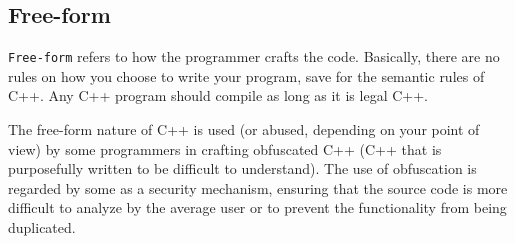 \subsection{Free-form}
\texttt{Free-form} refers to how the programmer crafts the code. Basically,
there are no rules on how you choose to write your program, save for the
semantic rules of C++. Any C++ program should compile as long as it is legal
C++.

The free-form nature of C++ is used (or abused, depending on your point of
view) by some programmers in crafting obfuscated C++ (C++ that is purposefully
written to be difficult to understand). The use of obfuscation is regarded by
some as a security mechanism, ensuring that the source code is more difficult
to analyze by the average user or to prevent the functionality from being
duplicated.
